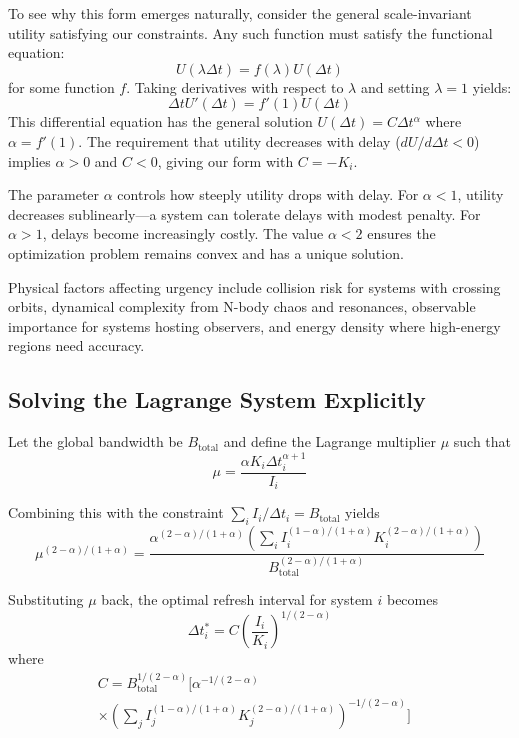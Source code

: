 \documentclass[usenatbib]{mnras}
\begin{document}
To see why this form emerges naturally, consider the general scale-invariant utility satisfying our constraints. Any such function must satisfy the functional equation:
\begin{equation}
U(\lambda \Delta t) = f(\lambda) U(\Delta t)
\end{equation}
for some function $f$. Taking derivatives with respect to $\lambda$ and setting $\lambda = 1$ yields:
\begin{equation}
\Delta t U'(\Delta t) = f'(1) U(\Delta t)
\end{equation}
This differential equation has the general solution $U(\Delta t) = C \Delta t^{\alpha}$ where $\alpha = f'(1)$. The requirement that utility decreases with delay ($dU/d\Delta t < 0$) implies $\alpha > 0$ and $C < 0$, giving our form with $C = -K_i$.

The parameter $\alpha$ controls how steeply utility drops with delay. For $\alpha < 1$, utility decreases sublinearly---a system can tolerate delays with modest penalty. For $\alpha > 1$, delays become increasingly costly. The value $\alpha < 2$ ensures the optimization problem remains convex and has a unique solution.

Physical factors affecting urgency include collision risk for systems with crossing orbits, dynamical complexity from N-body chaos and resonances, observable importance for systems hosting observers, and energy density where high-energy regions need accuracy.

\subsection{Solving the Lagrange System Explicitly}

Let the global bandwidth be $B_{\text{total}}$ and define the Lagrange multiplier $\mu$ such that
\begin{equation}
\mu = \frac{\alpha K_i \Delta t_i^{\alpha+1}}{I_i}
\end{equation}

Combining this with the constraint $\sum_i I_i / \Delta t_i = B_{\text{total}}$ yields
\begin{equation}
\mu^{(2-\alpha)/(1+\alpha)} = \frac{\alpha^{(2-\alpha)/(1+\alpha)} \left( \sum_i I_i^{(1-\alpha)/(1+\alpha)} K_i^{(2-\alpha)/(1+\alpha)} \right)}{B_{\text{total}}^{(2-\alpha)/(1+\alpha)}}
\end{equation}

Substituting $\mu$ back, the optimal refresh interval for system $i$ becomes
\begin{equation}
\Delta t_i^* = C \left( \frac{I_i}{K_i} \right)^{1/(2-\alpha)}
\end{equation}
where 
\begin{equation}
\begin{split}
C = B_{\text{total}}^{1/(2-\alpha)} \Bigg[ \alpha^{-1/(2-\alpha)} & \\
\times \left(\sum_j I_j^{(1-\alpha)/(1+\alpha)} K_j^{(2-\alpha)/(1+\alpha)} \right)^{-1/(2-\alpha)} \Bigg]
\end{split}
\end{equation}
\end{document}
